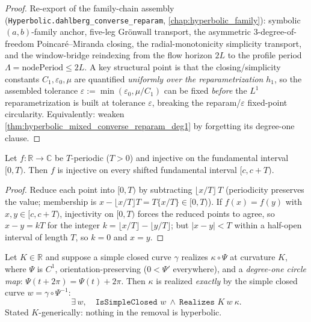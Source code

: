 \begin{proof}
  \leanok
  Re-export of the family-chain assembly
  (\texttt{Hyperbolic.dahlberg\_converse\_reparam},
  \cref{chap:hyperbolic_family}): symbolic $(a,b)$-family anchor, five-leg
  Gr\"onwall transport, the asymmetric $3$-degree-of-freedom
  Poincar\'e--Miranda closing, the radial-monotonicity simplicity transport,
  and the window-bridge reindexing from the flow horizon $2L$ to the profile
  period $\Lambda=\mathrm{nodePeriod}\le 2L$. A key structural point is that
  the closing/simplicity constants $C_1,\varepsilon_0,\mu$ are quantified
  \emph{uniformly over the reparametrization} $h_1$, so the assembled
  tolerance $\varepsilon:=\min(\varepsilon_0,\mu/C_1)$ can be fixed
  \emph{before} the $L^1$ reparametrization is built at tolerance
  $\varepsilon$, breaking the reparam/$\varepsilon$ fixed-point circularity.
  Equivalently: weaken \cref{thm:hyperbolic_mixed_converse_reparam_deg1} by
  forgetting its degree-one clause.
\end{proof}

\begin{lemma}
  \label{lem:injon_ico_shift_of_periodic}
  Let $f:\mathbb R\to\mathbb C$ be $T$-periodic ($T>0$) and injective on the
  fundamental interval $[0,T)$. Then $f$ is injective on every shifted
  fundamental interval $[c,c+T)$.
\end{lemma}

\begin{proof}

\leanok
  Reduce each point into $[0,T)$ by subtracting $\lfloor x/T\rfloor\,T$
  (periodicity preserves the value; membership is
  $x-\lfloor x/T\rfloor T=T\{x/T\}\in[0,T)$). If $f(x)=f(y)$ with
  $x,y\in[c,c+T)$, injectivity on $[0,T)$ forces the reduced points to agree,
  so $x-y=kT$ for the integer $k=\lfloor x/T\rfloor-\lfloor y/T\rfloor$; but
  $|x-y|<T$ within a half-open interval of length $T$, so $k=0$ and $x=y$.
\end{proof}

\begin{theorem}
  \label{thm:realizes_of_reparam_degree_one}
  Let $K\in\mathbb R$ and suppose a simple closed curve $\gamma$ realizes
  $\kappa\circ\Psi$ at curvature $K$, where $\Psi$ is $C^1$,
  orientation-preserving ($0<\Psi'$ everywhere), and a \emph{degree-one circle
  map}: $\Psi(t+2\pi)=\Psi(t)+2\pi$. Then $\kappa$ is realized \emph{exactly}
  by the simple closed curve $w=\gamma\circ\Psi^{-1}$:
  \[
    \exists\,w,\quad \texttt{IsSimpleClosed }w\ \wedge\
    \texttt{Realizes }K\ w\ \kappa .
  \]
  Stated $K$-generically: nothing in the removal is hyperbolic.
\end{theorem}

